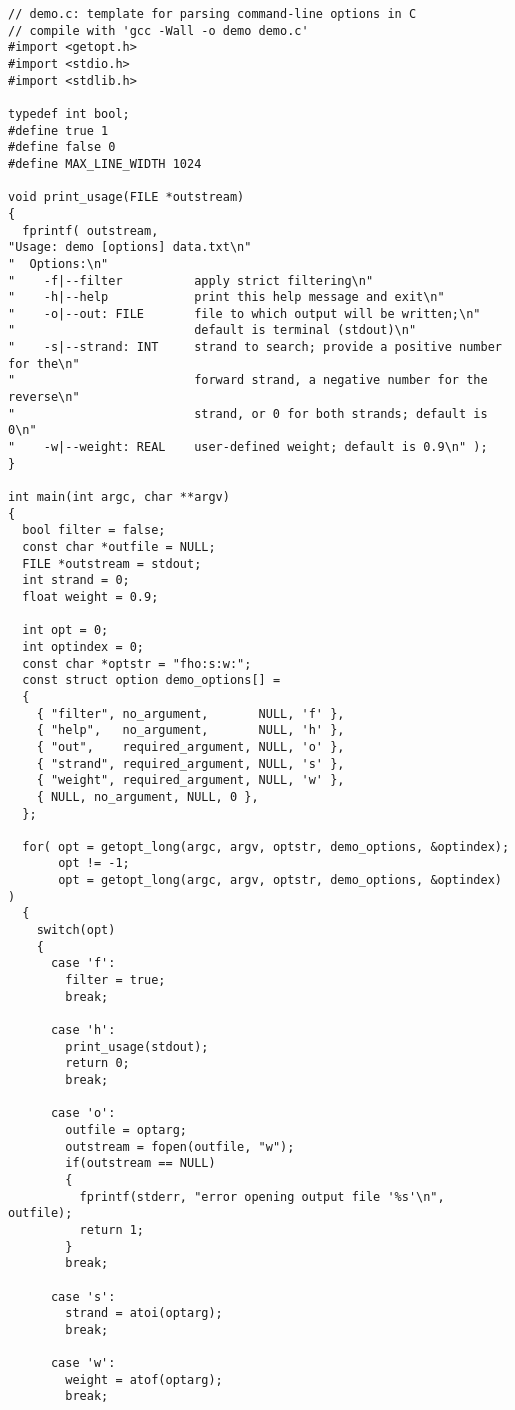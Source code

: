 \documentclass{article}
\begin{document}
\begin{verbatim}
// demo.c: template for parsing command-line options in C
// compile with 'gcc -Wall -o demo demo.c'
#import <getopt.h>
#import <stdio.h>
#import <stdlib.h>

typedef int bool;
#define true 1
#define false 0
#define MAX_LINE_WIDTH 1024

void print_usage(FILE *outstream)
{
  fprintf( outstream,
"Usage: demo [options] data.txt\n"
"  Options:\n"
"    -f|--filter          apply strict filtering\n"
"    -h|--help            print this help message and exit\n"
"    -o|--out: FILE       file to which output will be written;\n"
"                         default is terminal (stdout)\n"
"    -s|--strand: INT     strand to search; provide a positive number for the\n"
"                         forward strand, a negative number for the reverse\n"
"                         strand, or 0 for both strands; default is 0\n"
"    -w|--weight: REAL    user-defined weight; default is 0.9\n" );
}

int main(int argc, char **argv)
{
  bool filter = false;
  const char *outfile = NULL;
  FILE *outstream = stdout;
  int strand = 0;
  float weight = 0.9;
  
  int opt = 0;
  int optindex = 0;
  const char *optstr = "fho:s:w:";
  const struct option demo_options[] =
  {
    { "filter", no_argument,       NULL, 'f' },
    { "help",   no_argument,       NULL, 'h' },
    { "out",    required_argument, NULL, 'o' },
    { "strand", required_argument, NULL, 's' },
    { "weight", required_argument, NULL, 'w' },
    { NULL, no_argument, NULL, 0 },
  };
  
  for( opt = getopt_long(argc, argv, optstr, demo_options, &optindex);
       opt != -1;
       opt = getopt_long(argc, argv, optstr, demo_options, &optindex) )
  {
    switch(opt)
    {
      case 'f':
        filter = true;
        break;
      
      case 'h':
        print_usage(stdout);
        return 0;
        break;
      
      case 'o':
        outfile = optarg;
        outstream = fopen(outfile, "w");
        if(outstream == NULL)
        {
          fprintf(stderr, "error opening output file '%s'\n", outfile);
          return 1;
        }
        break;
      
      case 's':
        strand = atoi(optarg);
        break;
      
      case 'w':
        weight = atof(optarg);
        break;
      

\end{verbatim}
\end{document}
